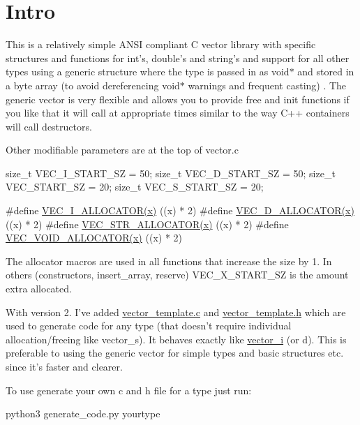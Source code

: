 \hypertarget{index_Intro}{}\section{Intro}\label{index_Intro}
This is a relatively simple A\-N\-S\-I compliant C vector library with specific structures and functions for int's, double's and string's and support for all other types using a generic structure where the type is passed in as void$\ast$ and stored in a byte array (to avoid dereferencing void$\ast$ warnings and frequent casting) . The generic vector is very flexible and allows you to provide free and init functions if you like that it will call at appropriate times similar to the way C++ containers will call destructors.

Other modifiable parameters are at the top of vector.\-c 
\begin{DoxyPre}
size\_t VEC\_I\_START\_SZ = 50;
size\_t VEC\_D\_START\_SZ = 50;
size\_t VEC\_START\_SZ = 20;
size\_t VEC\_S\_START\_SZ = 20;\end{DoxyPre}



\begin{DoxyPre}#define \hyperlink{vector__i_8c_a6d9a8fd1aaa4a8df09d79da016a5c5aa}{VEC\_I\_ALLOCATOR(x)} ((x) * 2)
#define \hyperlink{vector__d_8c_a024a194564bd2419ca1ac75e3cdec3e8}{VEC\_D\_ALLOCATOR(x)} ((x) * 2)
#define \hyperlink{vector__str_8c_ac6b46abc3594994ede1811c5268fa72f}{VEC\_STR\_ALLOCATOR(x)} ((x) * 2)
#define \hyperlink{vector__void_8c_a6f86fe931c02dfbb3d901d2f5e5ec969}{VEC\_VOID\_ALLOCATOR(x)} ((x) * 2)
\end{DoxyPre}
 The allocator macros are used in all functions that increase the size by 1. In others (constructors, insert\-\_\-array, reserve) V\-E\-C\-\_\-\-X\-\_\-\-S\-T\-A\-R\-T\-\_\-\-S\-Z is the amount extra allocated.

With version 2. I've added \hyperlink{vector__template_8c}{vector\-\_\-template.\-c} and \hyperlink{vector__template_8h}{vector\-\_\-template.\-h} which are used to generate code for any type (that doesn't require individual allocation/freeing like vector\-\_\-s). It behaves exactly like \hyperlink{structvector__i}{vector\-\_\-i} (or d). This is preferable to using the generic vector for simple types and basic structures etc. since it's faster and clearer.

To use generate your own c and h file for a type just run\-: 
\begin{DoxyPre}
python3 generate\_code.py yourtype
\end{DoxyPre}


